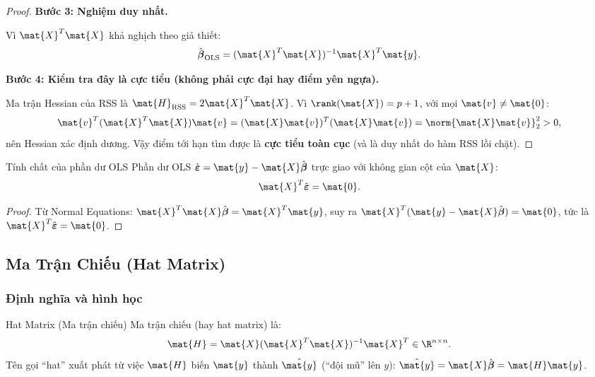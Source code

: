 \begin{proof}
\medskip
\noindent\textbf{Bước 3: Nghiệm duy nhất.}

Vì $\mat{X}^T\mat{X}$ khả nghịch theo giả thiết:
\[
    \hat{\boldsymbol{\beta}}_{\mathrm{OLS}}
    = (\mat{X}^T\mat{X})^{-1}\mat{X}^T\mat{y}.
\]

\medskip
\noindent\textbf{Bước 4: Kiểm tra đây là cực tiểu (không phải cực đại hay điểm yên ngựa).}

Ma trận Hessian của RSS là $\mat{H}_{\mathrm{RSS}} = 2\mat{X}^T\mat{X}$.
Vì $\rank(\mat{X}) = p+1$, với mọi $\mat{v} \neq \mat{0}$:
\[
    \mat{v}^T(\mat{X}^T\mat{X})\mat{v} = (\mat{X}\mat{v})^T(\mat{X}\mat{v}) = \norm{\mat{X}\mat{v}}_2^2 > 0,
\]
nên Hessian xác định dương. Vậy điểm tới hạn tìm được là \textbf{cực tiểu toàn cục}
(và là duy nhất do hàm RSS lồi chặt).
\end{proof}

\begin{mycor}{Tính chất của phần dư OLS}{}
Phần dư OLS $\hat{\boldsymbol{\varepsilon}} = \mat{y} - \mat{X}\hat{\boldsymbol{\beta}}$
trực giao với không gian cột của $\mat{X}$:
\[
    \mat{X}^T\hat{\boldsymbol{\varepsilon}} = \mat{0}.
\]
\end{mycor}

\begin{proof}
Từ Normal Equations:
$\mat{X}^T\mat{X}\hat{\boldsymbol{\beta}} = \mat{X}^T\mat{y}$,
suy ra $\mat{X}^T(\mat{y} - \mat{X}\hat{\boldsymbol{\beta}}) = \mat{0}$,
tức là $\mat{X}^T\hat{\boldsymbol{\varepsilon}} = \mat{0}$.
\end{proof}

\subsection{Ma Trận Chiếu (Hat Matrix)}

\subsubsection{Định nghĩa và hình học}

\begin{mydef}{Hat Matrix (Ma trận chiếu)}{}
Ma trận chiếu (hay hat matrix) là:
\[
    \mat{H} = \mat{X}(\mat{X}^T\mat{X})^{-1}\mat{X}^T \in \R^{n \times n}.
\]
Tên gọi ``hat'' xuất phát từ việc $\mat{H}$ biến $\mat{y}$ thành
$\hat{\mat{y}}$ (``đội mũ'' lên $y$):
$\hat{\mat{y}} = \mat{X}\hat{\boldsymbol{\beta}} = \mat{H}\mat{y}$.
\end{mydef}


